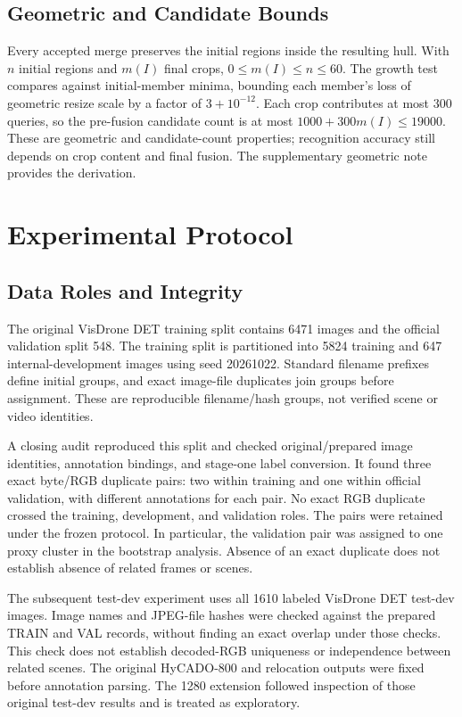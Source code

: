 \documentclass[journal]{IEEEtran}
\begin{document}
\subsection{Geometric and Candidate Bounds}
Every accepted merge preserves the initial regions inside the resulting hull. With $n$ initial regions and $m(I)$ final crops, $0\leq m(I)\leq n\leq60$. The growth test compares against initial-member minima, bounding each member's loss of geometric resize scale by a factor of $3+10^{-12}$. Each crop contributes at most 300 queries, so the pre-fusion candidate count is at most $1000+300m(I)\leq19000$. These are geometric and candidate-count properties; recognition accuracy still depends on crop content and final fusion. The supplementary geometric note provides the derivation.

\section{Experimental Protocol}
\subsection{Data Roles and Integrity}
The original VisDrone DET training split contains 6471 images and the official validation split 548. The training split is partitioned into 5824 training and 647 internal-development images using seed 20261022. Standard filename prefixes define initial groups, and exact image-file duplicates join groups before assignment. These are reproducible filename/hash groups, not verified scene or video identities.

A closing audit reproduced this split and checked original/prepared image identities, annotation bindings, and stage-one label conversion. It found three exact byte/RGB duplicate pairs: two within training and one within official validation, with different annotations for each pair. No exact RGB duplicate crossed the training, development, and validation roles. The pairs were retained under the frozen protocol. In particular, the validation pair was assigned to one proxy cluster in the bootstrap analysis. Absence of an exact duplicate does not establish absence of related frames or scenes.

The subsequent test-dev experiment uses all 1610 labeled VisDrone DET test-dev images. Image names and JPEG-file hashes were checked against the prepared TRAIN and VAL records, without finding an exact overlap under those checks. This check does not establish decoded-RGB uniqueness or independence between related scenes. The original HyCADO-800 and relocation outputs were fixed before annotation parsing. The 1280 extension followed inspection of those original test-dev results and is treated as exploratory.
\end{document}
